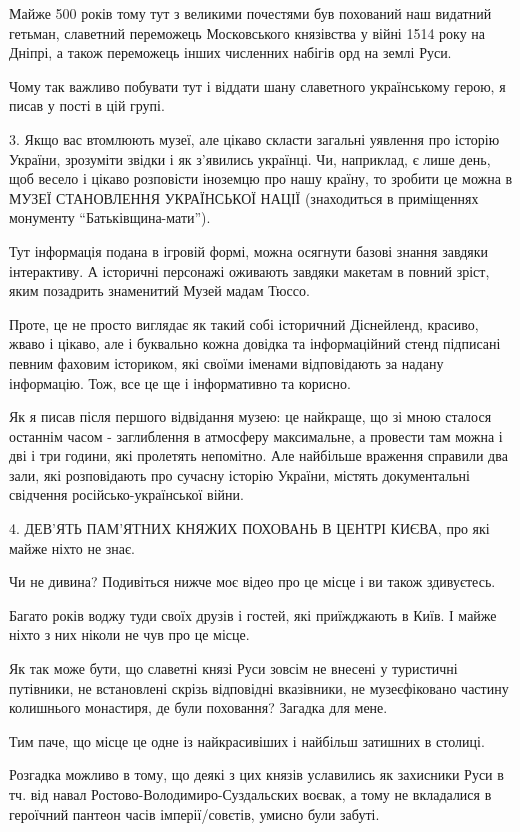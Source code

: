 Майже 500 років тому тут з великими почестями був похований наш видатний
гетьман, славетний переможець Московського князівства у війні 1514 року на
Дніпрі, а також переможець інших численних набігів орд на землі Руси.

Чому так важливо побувати тут і віддати шану славетного українському герою, я
писав у пості в цій групі. 

3. Якщо вас втомлюють музеї, але цікаво скласти загальні уявлення про історію
України, зрозуміти звідки і як з’явились українці. Чи, наприклад, є лише день,
щоб весело і цікаво розповісти іноземцю про нашу країну, то зробити це можна в
МУЗЕЇ СТАНОВЛЕННЯ УКРАЇНСЬКОЇ НАЦІЇ (знаходиться в приміщеннях монументу
\enquote{Батьківщина-мати}).

Тут інформація подана в ігровій формі, можна осягнути базові знання завдяки
інтерактиву. А історичні персонажі оживають завдяки макетам в повний зріст,
яким позадрить знаменитий Музей мадам Тюссо. 

Проте, це не просто виглядає як такий собі історичний Діснейленд, красиво,
жваво і цікаво, але і буквально кожна довідка та інформаційний стенд підписані
певним фаховим істориком, які своїми іменами відповідають за надану інформацію.
Тож, все це ще і інформативно та корисно.

Як я писав після першого відвідання музею: це найкраще, що зі мною сталося
останнім часом - заглиблення в атмосферу максимальне, а провести там можна і
дві і три години, які пролетять непомітно. Але найбільше враження справили два
зали, які розповідають про сучасну історію України, містять документальні
свідчення російсько-української війни.


4. ДЕВ'ЯТЬ ПАМ'ЯТНИХ КНЯЖИХ ПОХОВАНЬ В ЦЕНТРІ КИЄВА, про які майже ніхто не знає.

Чи не дивина? Подивіться нижче моє відео про це місце і ви також здивуєтесь.

Багато років воджу туди своїх друзів і гостей, які приїжджають в Київ. І майже
ніхто з них ніколи не чув про це місце.

Як так може бути, що славетні князі Руси зовсім не внесені у туристичні
путівники, не встановлені скрізь відповідні вказівники, не музеєфіковано
частину колишнього монастиря, де були поховання? Загадка для мене. 

Тим паче, що місце це одне із найкрасивіших і найбільш затишних в столиці. 

Розгадка можливо в тому, що деякі з цих князів уславились як захисники Руси в
тч. від навал Ростово-Володимиро-Суздальских воєвак, а тому не вкладалися в
героїчний пантеон часів імперії/совєтів, умисно були забуті.

